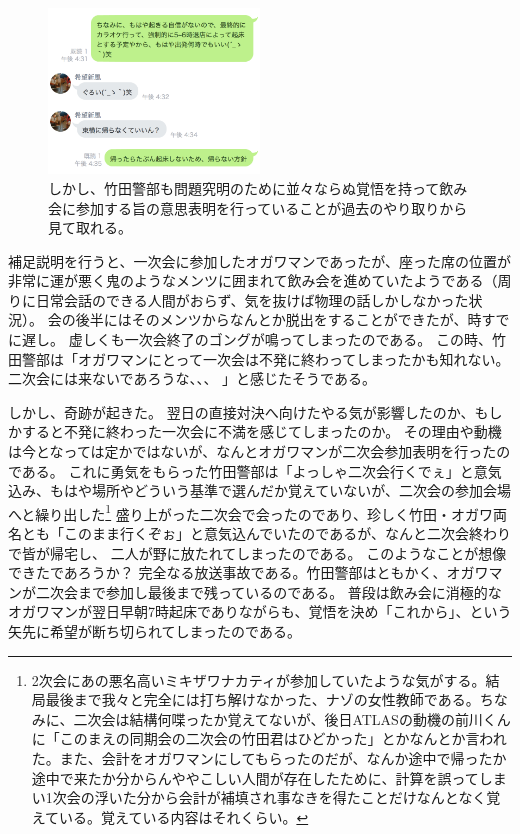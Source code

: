\begin{figure}[htbp]
  \begin{center}
    \includegraphics[width=0.5\textwidth]{./section/sasakiLIVE/figures/TakedaYaruki.png}
  \end{center}
  \caption{しかし、竹田警部も問題究明のために並々ならぬ覚悟を持って飲み会に参加する旨の意思表明を行っていることが過去のやり取りから見て取れる。}
  \label{fig:TakedaYaruki}
\end{figure}

補足説明を行うと、一次会に参加したオガワマンであったが、座った席の位置が非常に運が悪く鬼のようなメンツに囲まれて飲み会を進めていたようである（周りに日常会話のできる人間がおらず、気を抜けば物理の話しかしなかった状況）。
会の後半にはそのメンツからなんとか脱出をすることができたが、時すでに遅し。
虚しくも一次会終了のゴングが鳴ってしまったのである。
この時、竹田警部は「オガワマンにとって一次会は不発に終わってしまったかも知れない。二次会には来ないであろうな、、、 」と感じたそうである。

\par

しかし、奇跡が起きた。
翌日の直接対決へ向けたやる気が影響したのか、もしかすると不発に終わった一次会に不満を感じてしまったのか。
その理由や動機は今となっては定かではないが、なんとオガワマンが二次会参加表明を行ったのである。
これに勇気をもらった竹田警部は「よっしゃ二次会行くでぇ」と意気込み、もはや場所やどういう基準で選んだか覚えていないが、二次会の参加会場へと繰り出した\footnote{2次会にあの悪名高いミキザワナカティが参加していたような気がする。結局最後まで我々と完全には打ち解けなかった、ナゾの女性教師である。ちなみに、二次会は結構何喋ったか覚えてないが、後日ATLASの動機の前川くんに「このまえの同期会の二次会の竹田君はひどかった」とかなんとか言われた。また、会計をオガワマンにしてもらったのだが、なんか途中で帰ったか途中で来たか分からんややこしい人間が存在したために、計算を誤ってしまい1次会の浮いた分から会計が補填され事なきを得たことだけなんとなく覚えている。覚えている内容はそれくらい。}
盛り上がった二次会で会ったのであり、珍しく竹田・オガワ両名とも「このまま行くぞぉ」と意気込んでいたのであるが、なんと二次会終わりで皆が帰宅し、 二人が野に放たれてしまったのである。
このようなことが想像できたであろうか？
完全なる放送事故である。竹田警部はともかく、オガワマンが二次会まで参加し最後まで残っているのである。
普段は飲み会に消極的なオガワマンが翌日早朝7時起床でありながらも、覚悟を決め「これから」、という矢先に希望が断ち切られてしまったのである。

